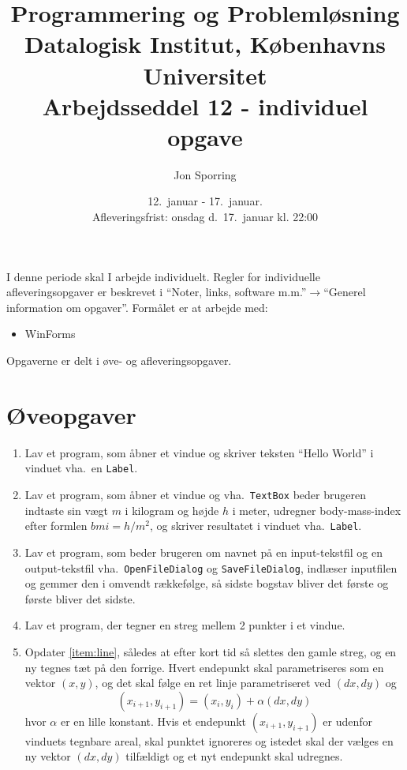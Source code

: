 \documentclass[a4paper,12pt]{article}
\title{Programmering og Problemløsning\\Datalogisk Institut,
  Københavns Universitet\\Arbejdsseddel 12 - individuel opgave}
\author{Jon Sporring}
\date{12.\ januar - 17.\ januar.\\Afleveringsfrist: onsdag d.\ 17.\ januar kl. 22:00}
\begin{document}
\maketitle

I denne periode skal I arbejde individuelt. Regler for individuelle afleveringsopgaver er beskrevet i "`Noter, links, software m.m."'$\rightarrow$"`Generel information om opgaver"'. Formålet er at arbejde med:
\begin{itemize}
\item WinForms
\end{itemize}

Opgaverne er delt i øve- og afleveringsopgaver. 

\section*{Øveopgaver}
\begin{enumerate}[label=12ø.\arabic*,start=0]
\item Lav et program, som åbner et vindue og skriver teksten ``Hello
  World'' i vinduet vha.\ en \lstinline{Label}.
\item Lav et program, som åbner et vindue og vha.\ \lstinline{TextBox} 
  beder brugeren indtaste sin vægt $m$ i kilogram og højde $h$ i meter, udregner
  body-mass-index efter formlen $bmi = h/m^2$, og skriver resultatet i
  vinduet vha.\  \lstinline{Label}.
\item Lav et program, som beder brugeren om navnet på en input-tekstfil og
  en output-tekstfil vha.\ \lstinline{OpenFileDialog} og
  \lstinline{SaveFileDialog}, indlæser inputfilen og gemmer den i omvendt
  rækkefølge, så sidste bogstav bliver det første og første bliver det sidste.
\item \label{item:line} Lav et program, der tegner en streg mellem 2 punkter i et
  vindue.
\item Opdater \ref{item:line}, således at efter kort tid så slettes
  den gamle streg, og en ny tegnes tæt på den forrige. Hvert endepunkt
  skal parametriseres som en vektor $(x,y)$, og det skal følge en ret
  linje parametriseret ved $(dx, dy)$ og
  \begin{equation}
    (x_{i+1}, y_{i+1}) = (x_i,y_i) + \alpha (dx, dy)
  \end{equation}
  hvor $\alpha$ er en lille konstant. Hvis et endepunkt $(x_{i+1}, y_{i+1})$ er
  udenfor vinduets tegn\-bare areal, skal punktet ignoreres og istedet
  skal der vælges en ny vektor $(dx,dy)$ tilfældigt og et nyt
  endepunkt skal udregnes.
\end{enumerate}
\end{document}
